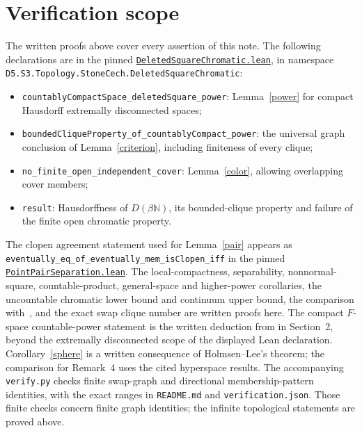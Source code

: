 \documentclass[11pt]{article}
\newcommand{\N}{\mathbb N}
\begin{document}
\section{Verification scope}
The written proofs above cover every assertion of this note.
The following declarations are in the pinned
\href{https://github.com/the-omega-institute/trureturing/blob/eac52692d71b89f89bd7c0d8c734ddc9c5d9e61d/D5/S3/Topology/StoneCech/DeletedSquareChromatic.lean}{\nolinkurl{DeletedSquareChromatic.lean}},
in namespace
\nolinkurl{D5.S3.Topology.StoneCech.DeletedSquareChromatic}:
\begin{itemize}
\item \nolinkurl{countablyCompactSpace_deletedSquare_power}: Lemma~\ref{power}
for compact Hausdorff extremally disconnected spaces;
\item \nolinkurl{boundedCliqueProperty_of_countablyCompact_power}:
the universal graph conclusion of Lemma~\ref{criterion}, including
finiteness of every clique;
\item \nolinkurl{no_finite_open_independent_cover}:
Lemma~\ref{color}, allowing overlapping cover members;
\item \texttt{result}: Hausdorffness of $D(\beta\N)$, its bounded-clique
property and failure of the finite open chromatic property.
\end{itemize}
The clopen agreement statement used for Lemma~\ref{pair} appears as
\nolinkurl{eventually_eq_of_eventually_mem_isClopen_iff} in the pinned
\href{https://github.com/the-omega-institute/trureturing/blob/eac52692d71b89f89bd7c0d8c734ddc9c5d9e61d/D5/S3/Topology/ExtremallyDisconnected/PointPairSeparation.lean}{\nolinkurl{PointPairSeparation.lean}}.
The local-compactness, separability, nonnormal-square, countable-product,
general-space and higher-power corollaries, the uncountable chromatic lower
bound and continuum upper bound, the comparison with~\cite{BHM}, and the
exact swap clique number are written proofs here. The compact
$F$-space countable-power statement is the written deduction from
\cite[Lemma~2.1]{PPS} in Section~2, beyond the extremally disconnected
scope of the displayed Lean declaration. Corollary~\ref{sphere}
is a written consequence of Holmsen--Lee's theorem; the comparison for
Remark~4 uses the cited hyperspace results. The accompanying
\texttt{verify.py} checks finite swap-graph and directional membership-pattern
identities, with the exact ranges in \texttt{README.md} and
\texttt{verification.json}. Those finite checks concern finite graph
identities; the infinite topological statements are proved above.
\end{document}

